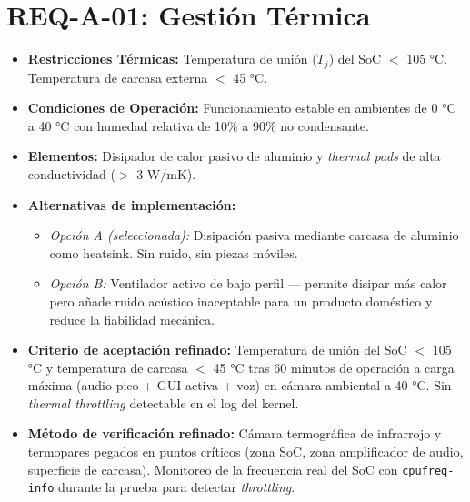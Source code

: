\documentclass[%
	paper=a4,
	twoside=false,
	parskip=half,
	chapterprefix=false,
	10pt,
	headings=normal,
	bibliography=totoc,
	listof=totoc,
	titlepage=on,
	captions=tableabove,
	draft=false,
]{scrbook}%
\begin{document}
\section{REQ-A-01: Gestión Térmica}
\begin{itemize}
    \item \textbf{Restricciones Térmicas:} Temperatura de unión ($T_j$) del SoC $<$ 105 °C. Temperatura de carcasa externa $<$ 45 °C.
    \item \textbf{Condiciones de Operación:} Funcionamiento estable en ambientes de 0 °C a 40 °C con humedad relativa de 10\% a 90\% no condensante.
    \item \textbf{Elementos:} Disipador de calor pasivo de aluminio y \textit{thermal pads} de alta conductividad ($>$ 3 W/mK).
    \item \textbf{Alternativas de implementación:}
        \begin{itemize}
            \item \textit{Opción A (seleccionada):} Disipación pasiva mediante carcasa de aluminio como heatsink. Sin ruido, sin piezas móviles.
            \item \textit{Opción B:} Ventilador activo de bajo perfil — permite disipar más calor pero añade ruido acústico inaceptable para un producto doméstico y reduce la fiabilidad mecánica.
        \end{itemize}
    \item \textbf{Criterio de aceptación refinado:} Temperatura de unión del SoC $<$ 105 °C y temperatura de carcasa $<$ 45 °C tras 60 minutos de operación a carga máxima (audio pico + GUI activa + voz) en cámara ambiental a 40 °C. Sin \textit{thermal throttling} detectable en el log del kernel.
    \item \textbf{Método de verificación refinado:} Cámara termográfica de infrarrojo y termopares pegados en puntos críticos (zona SoC, zona amplificador de audio, superficie de carcasa). Monitoreo de la frecuencia real del SoC con \texttt{cpufreq-info} durante la prueba para detectar \textit{throttling}.
\end{itemize}

\end{document}
